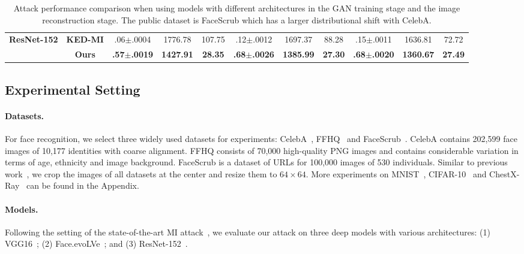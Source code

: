 \documentclass[letterpaper]{article} %
\begin{document}
\begin{table}[ht!]
{\begin{tabular}{@{}ccccccccccc@{}}
    \multirow{2}{*}{\textbf{ResNet-152}}             & \textbf{KED-MI}           & .06$\pm$.0004                        & 1776.78                        & 107.75                    & .12$\pm$.0012                      & 1697.37                        & 88.28                     & .15$\pm$.0011                      & 1636.81                        & 72.72                     \\
                                                        & \textbf{Ours}             & \textbf{.57$\pm$.0019}               & \textbf{1427.91}               & \textbf{28.35}            & \textbf{.68$\pm$.0026}             & \textbf{1385.99}               & \textbf{27.30}            & \textbf{.68$\pm$.0020}             & \textbf{1360.67}               & \textbf{27.49}            \\ \bottomrule
\end{tabular}
}
\caption{Attack performance comparison when using models with different architectures in the GAN training stage and the image reconstruction stage. The public dataset is FaceScrub which has a larger distributional shift with CelebA.}
\label{tab: cross_model_dataset_results2}
\end{table}


\subsection{Experimental Setting}

\paragraph{Datasets.}
For face recognition, we select three widely used datasets for experiments: CelebA~\cite{liu2015deep}, FFHQ~\cite{karras2019style} and FaceScrub~\cite{ng2014data}. CelebA contains 202,599 face images of 10,177 identities with coarse alignment. FFHQ consists of 70,000 high-quality PNG images and contains considerable variation in terms of age, ethnicity and image background. FaceScrub is a dataset of URLs for 100,000 images of 530 individuals. Similar to previous work~\cite{zhang2020secret, chen2021knowledge, kahla2022label}, we crop the images of all datasets at the center and resize them to $64 \times 64$. More experiments on MNIST~\cite{lecun1998gradient}, CIFAR-10~\cite{krizhevsky2009learning} and ChestX-Ray~\cite{wang2017chestx} can be found in the Appendix.

\paragraph{Models.}
Following the setting of the state-of-the-art MI attack~\cite{chen2021knowledge}, we evaluate our attack on three deep models with various architectures: (1) VGG16~\cite{simonyan2014very}; (2) Face.evoLVe~\cite{cheng2017know}; and (3) ResNet-152~\cite{he2016deep}.
\end{document}
